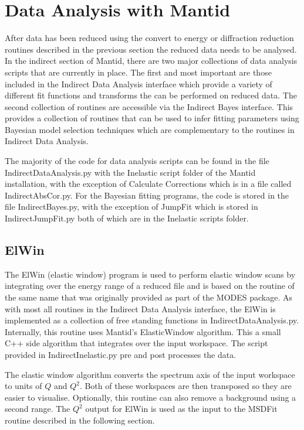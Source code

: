\documentclass[paper=a4, fontsize=11pt]{scrartcl}	%
\numberwithin{equation}{section}															%
\numberwithin{figure}{section}																%
\numberwithin{table}{section}																%
\begin{document}
\section{Data Analysis with Mantid}
After data has been reduced using the convert to energy or diffraction reduction routines described in the previous section the reduced data needs to be analysed. In the indirect section of Mantid, there are two major collections of data analysis scripts that are currently in place. The first  and most important are those included in the Indirect Data Analysis interface which provide a variety of different fit functions and transforms the can be performed on reduced data. The second collection of routines are accessible via the Indirect Bayes interface. This provides a collection of routines that can be used to infer fitting parameters using Bayesian model selection techniques which are complementary to the routines in Indirect Data Analysis.

The majority of the code for data analysis scripts can be found in the file IndirectDataAnalysis.py with the Inelastic script folder of the Mantid installation, with the exception of Calculate Corrections which is in a file called IndirectAbsCor.py. For the Bayesian fitting programs, the code is stored in the file IndirectBayes.py, with the exception of JumpFit which is stored in IndirectJumpFit.py both of which are in the Inelastic scripts folder.

\subsection{ElWin}
The ElWin (elastic window) program is used to perform elastic window scans by integrating over the energy range of a reduced file and is based on the routine of the same name that was originally provided as part of the MODES package. As with most all routines in the Indirect Data Analysis interface, the ElWin is implemented as a collection of free standing functions in IndirectDataAnalysis.py. Internally, this routine uses Mantid's ElasticWindow algorithm. This a small C++ side algorithm that integrates over the input workspace. The script provided in IndirectInelastic.py pre and post processes the data. 

The elastic window algorithm converts the spectrum axis of the input workspace to units of $Q$ and $Q^2$. Both of these workspaces are then transposed so they are easier to visualise. Optionally, this routine can also remove a background using a second range. The $Q^2$ output for ElWin is used as the input to the MSDFit routine described in the following section.
\end{document}
